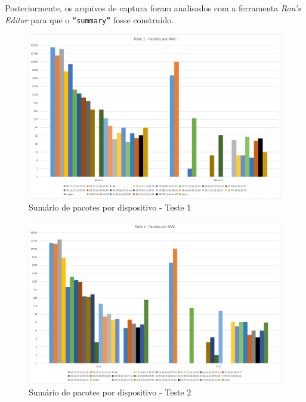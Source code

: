 Posteriormente, os arquivos de captura foram analisados com a ferramenta
\emph{Ron’s Editor} para que o \texttt{``summary''} fosse construído.

\clearpage
\begin{figure}[ht]
	\centering
	\caption{\label{fig-mg4-noise-t1}Sumário de pacotes por dispositivo - Teste 1}
	\includegraphics[height=0.32\textheight,width=1\textwidth]{060-testes/data-analisis/distance-mg4plus-netflix/Teste1.png}
\end{figure}

\begin{figure}[hb]
	\centering
	\caption{\label{fig-mg4-noise-t2}Sumário de pacotes por dispositivo - Teste 2}
	\includegraphics[height=0.32\textheight,width=1\textwidth]{060-testes/data-analisis/distance-mg4plus-netflix/Teste2.png}
\end{figure}

